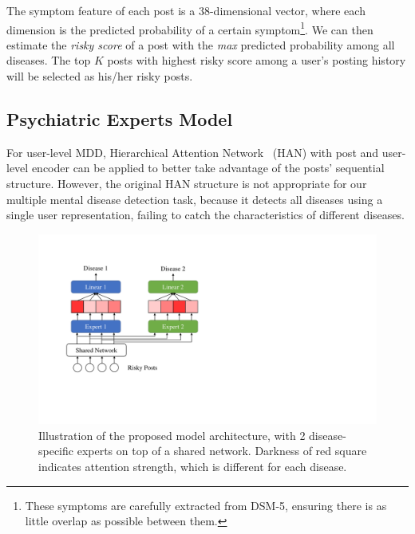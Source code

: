 The symptom feature of each post is a 38-dimensional vector, where each dimension is the predicted probability of a certain symptom\footnote{These symptoms are carefully extracted from DSM-5, ensuring there is as little overlap as possible between them.}.
We can then estimate the \textit{risky score} of a post with the \textit{max} predicted probability among all diseases. The top $K$ posts with highest risky score among a user's posting history will be selected as his/her risky posts. 

\subsection{Psychiatric Experts Model}
\label{sec:PsyEx_model}

For user-level MDD, Hierarchical Attention Network~\cite{yang2016hierarchical} (HAN) with post and user-level encoder can be applied to better take advantage of the posts' sequential structure. However, the original HAN structure is not appropriate for our multiple mental disease detection task, because it detects all diseases using a single user representation, failing to catch the characteristics of different diseases. 

\begin{figure}[t]
    \centering
    \includegraphics[width=0.8\columnwidth]{figures/model_arch.pdf}
    \caption{Illustration of the proposed model architecture, with 2 disease-specific experts on top of a shared network. Darkness of red
square indicates attention strength, which is different for each disease. }
    \label{fig:model_arch}
\end{figure}

